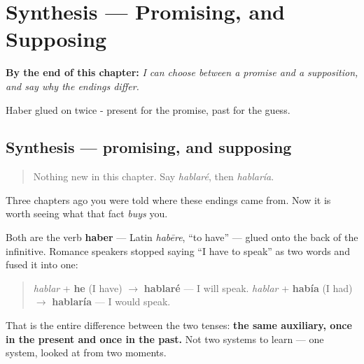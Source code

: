 
\chapter{Synthesis --- Promising, and Supposing}
\label{ch:spanish-synthesis-future-conditional}

\begin{chapteropening}
\textbf{By the end of this chapter:} \emph{I can choose between a promise and a supposition, and say why the endings differ.}

Haber glued on twice - present for the promise, past for the guess.
\end{chapteropening}

\section[Practice]{Synthesis — promising, and supposing}

\label{lesson:ES-C17-sintesis-futuro-condicional}



\begin{quote}
Nothing new in this chapter. Say \emph{hablaré}, then \emph{hablaría}.
\end{quote}

\begin{grammarlens}[title={Grammar Lens: the two endings are one word, twice}]
Three chapters ago you were told where these endings came from. Now it is worth seeing what that fact \emph{buys} you.

Both are the verb \textbf{haber} — Latin \emph{habēre}, \textquotedblleft{}to have\textquotedblright{} — glued onto the back of the infinitive. Romance speakers stopped saying \textquotedblleft{}I have to speak\textquotedblright{} as two words and fused it into one:

\begin{quote}
\emph{hablar} + \textbf{he} (I have) $\to$ \textbf{hablaré} — I will speak. \emph{hablar} + \textbf{había} (I had) $\to$ \textbf{hablaría} — I would speak.
\end{quote}

That is the entire difference between the two tenses: \textbf{the same auxiliary, once in the present and once in the past.} Not two systems to learn — one system, looked at from two moments.
\end{grammarlens}

